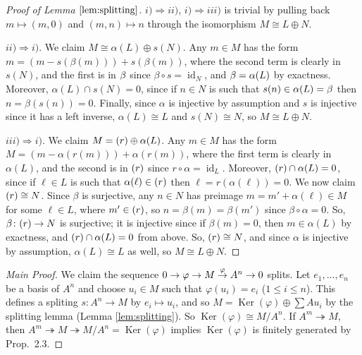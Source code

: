 \documentclass[12pt,letterpaper]{article}
\theoremstyle{definition}
\theoremstyle{remark}
\numberwithin{figure}{problem}
\numberwithin{equation}{section}
\let\ker\relax
\DeclareMathOperator{\ker}{Ker}
\DeclareMathOperator{\Ker}{Ker}
\DeclareMathOperator{\id}{id}
\begin{document}
\begin{proof}[Proof of Lemma
  $\ref{lem:splitting}$]
  $i) \Rightarrow
  ii)$,
  $i) \Rightarrow
  iii)$ is trivial by pulling back
  $m \mapsto
  (m,0)$ and
  $(m,n) \mapsto
  n$ through the isomorphism
  $M \cong L \oplus
  N$.
  \par
  $ii) \Rightarrow
  i)$.
  We claim
  $M \cong \alpha(L) \oplus
  s(N)$.
  Any
  $m \in
  M$ has the form
  $m = (m - s(\beta(m))) +
  s(\beta(m))$, where the second term is clearly in
  $s(N)$, and the first is in
  $\ker\beta$ since
  $\beta \circ s =
  \id_N$, and
  $\ker\beta =
  \alpha(L)$ by exactness.
  Moreover,
  $\alpha(L) \cap s(N) =
  0$, since if
  $n \in
  N$ is such that
  $s(n) \in \alpha(L) =
  \ker\beta$ then
  $n = \beta(s(n)) =
  0$.
  Finally, since
  $\alpha$ is injective by assumption and
  $s$ is injective since it has a left inverse,
  $\alpha(L) \cong
  L$ and
  $s(N) \cong
  N$, so
  $M \cong L \oplus
  N$.
  \par
  $iii) \Rightarrow
  i)$.
  We claim
  $M = \ker(r) \oplus
  \alpha(L)$.
  Any
  $m \in
  M$ has the form
  $M = (m - \alpha(r(m))) +
  \alpha(r(m))$, where the first term is clearly in
  $\alpha(L)$, and the second is in
  $\ker(r)$ since
  $r \circ \alpha =
  \id_L$.
  Moreover,
  $\ker(r) \cap \alpha(L) =
  0$, since if
  $\ell \in
  L$ is such that
  $\alpha(\ell) \in
  \ker(r)$ then
  $\ell = r(\alpha(\ell)) =
  0$.
  We now claim
  $\ker(r) \cong
  N$.
  Since
  $\beta$ is surjective, any
  $n \in
  N$ has preimage
  $m = m' + \alpha(\ell) \in
  M$ for some
  $\ell \in
  L$, where
  $m' \in
  \ker(r)$, so
  $n = \beta(m) =
  \beta(m')$ since
  $\beta \circ \alpha =
  0$.
  So,
  $\beta\colon \ker(r) \to
  N$ is surjective; it is injective since if
  $\beta(m) =
  0$, then
  $m \in
  \alpha(L)$ by exactness, and
  $\ker(r) \cap \alpha(L) =
  0$ from above.
  So,
  $\ker(r) \cong
  N$, and since
  $\alpha$ is injective by assumption,
  $\alpha(L) \cong
  L$ as well, so
  $M \cong L \oplus
  N$.
\end{proof}
\begin{proof}[Main Proof]
  We claim the sequence
  $0 \to \ker\varphi \to M \overset{\varphi}{\to} A^n \to
  0$ splits.
  Let
  $e_1,\ldots,e_n$ be a basis of
  $A^n$ and choose
  $u_i \in
  M$ such that
  $\varphi(u_i) =
  e_i$ ($1 \le i \le
  n$).
  This defines a spliting
  $s\colon A^n \to
  M$ by
  $e_i \mapsto
  u_i$, and so
  $M = \Ker(\varphi) \oplus \sum
  Au_i$ by the splitting lemma (Lemma \ref{lem:splitting}).
  So
  $\Ker(\varphi) \cong
  M/A^n$.
  If
  $A^m \twoheadrightarrow
  M$, then
  $A^m \twoheadrightarrow M \twoheadrightarrow M/A^n =
  \Ker(\varphi)$ implies
  $\Ker(\varphi)$ is finitely generated by Prop.~2.3.
\end{proof}
\end{document}
